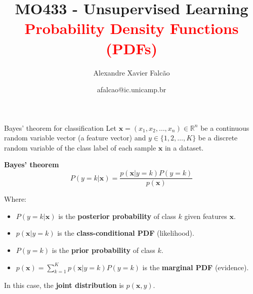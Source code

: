 \documentclass{beamer}
\title[MO433 - Unsupervised Learning]{MO433 - Unsupervised Learning \\ \textcolor{red}{Probability Density Functions (PDFs)}}
\author{Alexandre Xavier Falc{\~{a}}o}
\institute[IC-UNICAMP]{Institute of Computing - UNICAMP}
\date{afalcao@ic.unicamp.br}
\newcommand{\x}{\mathbf{x}}
\begin{document}
\begin{frame}
\titlepage
\end{frame}

\begin{frame}{Bayes' theorem for classification}
Let $\x = (x_1, x_2, \ldots, x_n) \in \mathbb{R}^n$ be a continuous
random variable vector (a \alert{feature vector}) and $y \in \{1, 2,
\ldots, K\}$ be a discrete random variable of the class label of each
sample $\x$ in a dataset.

\begin{block}{\textbf{Bayes' theorem}}
$$P(y = k|\x) = \frac{p(\x|y = k)P(y = k)}{p(\x)}$$
\end{block}

Where:
\begin{itemize}
\item $P(y = k|\x)$ is the \textbf{posterior probability} of class $k$ given features $\x$.
\item $p(\x|y = k)$ is the \textbf{class-conditional PDF} (likelihood).
\item $P(y = k)$ is the \textbf{prior probability} of class $k$.
\item $p(\x) = \sum_{k=1}^K p(\x|y = k)P(y = k)$ is the \textbf{marginal PDF} (evidence).
\end{itemize}
In this case, the \textbf{joint distribution} is $p(\x,y)$.
\end{frame}
\end{document}
